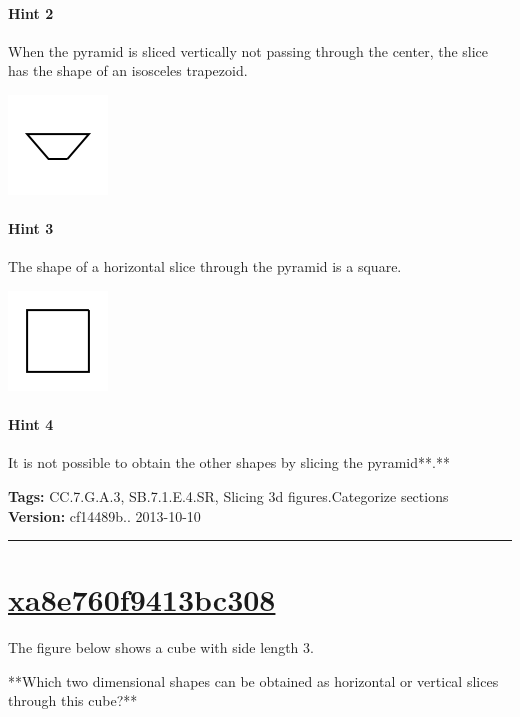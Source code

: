 \documentclass[twocolumn,10pt]{article}
\def\shrinkfactor{0.4}
\begin{document}
\paragraph{Hint 2}When the pyramid is sliced vertically not passing through the center, the slice has the shape of an isosceles trapezoid.   

\includegraphics[scale=\shrinkfactor]{figures/74b03954d4d97fddf5e1a1fb63ad8480bd41aaa9.png}

\paragraph{Hint 3}The shape of a horizontal slice through the pyramid is a square.  

\includegraphics[scale=\shrinkfactor]{figures/4b59a0ece6acc7c19c389e1de534d1df93bf1169.png}

\paragraph{Hint 4}It is not possible to obtain the other shapes by slicing the pyramid**.**



\medskip
\noindent
\textbf{Tags:} {\footnotesize CC.7.G.A.3, SB.7.1.E.4.SR, Slicing 3d figures.Categorize sections}\\
\textbf{Version:} cf14489b.. 2013-10-10
\smallskip\hrule





\section{\href{https://www.khanacademy.org/devadmin/content/items/xa8e760f9413bc308}{xa8e760f9413bc308}}

\noindent
The figure below shows a cube with side length $3$. 

**Which two dimensional shapes can be obtained as  horizontal or vertical slices through this cube?**  
\end{document}
